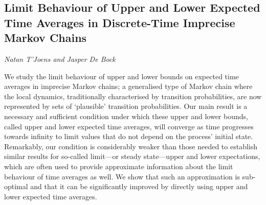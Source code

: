 \documentclass[../booklet.tex]{subfiles}
\begin{document}
\subsection[Limit Behaviour of Upper and Lower Expected Time Averages in Discrete-Time Imprecise Markov Chains. {\it Natan T'Joens and Jasper De Bock}]{Limit Behaviour of Upper and Lower Expected Time Averages in Discrete-Time Imprecise Markov Chains}
 

\begin{center}
  {\it Natan T'Joens and Jasper De Bock}
\end{center}

\vskip 0.8cm


We study the limit behaviour of upper and lower bounds on expected time averages in imprecise Markov chains; a generalised type of Markov chain where the local dynamics, traditionally characterised by transition probabilities, are now represented by sets of `plausible' transition probabilities.
Our main result is a necessary and sufficient condition under which these upper and lower bounds, called upper and lower expected time averages, will converge as time progresses towards infinity to limit values that do not depend on the process' initial state.
Remarkably, our condition is considerably weaker than those needed to establish similar results for so-called limit---or steady state---upper and lower expectations, which are often used to provide approximate information about the limit behaviour of time averages as well.
We show that such an approximation is sub-optimal and that it can be significantly improved by directly using upper and lower expected time averages.
\end{document}
